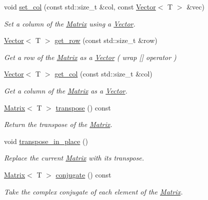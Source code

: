 \begin{DoxyCompactItemize}
void \hyperlink{classLuna_1_1Matrix_a0fafe609e8aa9811537de0f83ef92c99}{set\+\_\+col} (const std\+::size\+\_\+t \&col, const \hyperlink{classLuna_1_1Vector}{Vector}$<$ T $>$ \&vec)
\begin{DoxyCompactList}\small\item\em Set a column of the \hyperlink{classLuna_1_1Matrix}{Matrix} using a \hyperlink{classLuna_1_1Vector}{Vector}. \end{DoxyCompactList}\item 
\hyperlink{classLuna_1_1Vector}{Vector}$<$ T $>$ \hyperlink{classLuna_1_1Matrix_a3cb45a069b0ef89e0d8a93b8affed1eb}{get\+\_\+row} (const std\+::size\+\_\+t \&row)
\begin{DoxyCompactList}\small\item\em Get a row of the \hyperlink{classLuna_1_1Matrix}{Matrix} as a \hyperlink{classLuna_1_1Vector}{Vector} ( wrap \mbox{[}\mbox{]} operator ) \end{DoxyCompactList}\item 
\hyperlink{classLuna_1_1Vector}{Vector}$<$ T $>$ \hyperlink{classLuna_1_1Matrix_af2d1e695475fdde06224b2d5937794bb}{get\+\_\+col} (const std\+::size\+\_\+t \&col)
\begin{DoxyCompactList}\small\item\em Get a column of the \hyperlink{classLuna_1_1Matrix}{Matrix} as a \hyperlink{classLuna_1_1Vector}{Vector}. \end{DoxyCompactList}\item 
\hyperlink{classLuna_1_1Matrix}{Matrix}$<$ T $>$ \hyperlink{classLuna_1_1Matrix_ac37dcb8d2dc12b18df3ce416016aabf9}{transpose} () const
\begin{DoxyCompactList}\small\item\em Return the transpose of the \hyperlink{classLuna_1_1Matrix}{Matrix}. \end{DoxyCompactList}\item 
void \hyperlink{classLuna_1_1Matrix_adccfbb96c27eb230b0c5c63b458c7650}{transpose\+\_\+in\+\_\+place} ()
\begin{DoxyCompactList}\small\item\em Replace the current \hyperlink{classLuna_1_1Matrix}{Matrix} with its transpose. \end{DoxyCompactList}\item 
\hyperlink{classLuna_1_1Matrix}{Matrix}$<$ T $>$ \hyperlink{classLuna_1_1Matrix_a29b73b01b1851be977115fc3008aaf64}{conjugate} () const
\begin{DoxyCompactList}\small\item\em Take the complex conjugate of each element of the \hyperlink{classLuna_1_1Matrix}{Matrix}. \end{DoxyCompactList}\item 

\end{DoxyCompactItemize}

